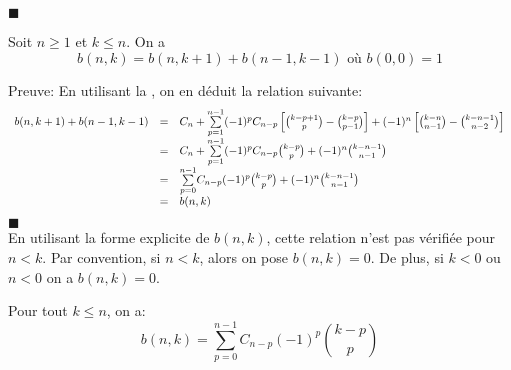 $\blacksquare$\vspace{5pt}
\begin{proposition} \label{bnkRec}
	Soit $ n\geq 1$ et $k\leq n$. On a
	\begin{equation} \label{eq:bnkRec}
		b(n,k)=b(n,k+1)+b(n-1,k-1) \text{ où } b(0,0)=1 %
	\end{equation}
\end{proposition}
Preuve:
En utilisant la , on en déduit la relation suivante:\\
\[
	\begin{array}{r c l}
		b(n,k+1)+ b(n-1,k-1) & = & C_{n}+\underset{p=1}{\overset{n-1}{\sum}}(-1)^pC_{n-p}\left[ \binom{k-p+1}{p}-\binom{k-p}{p-1} \right]+(-1)^n\left[ \binom{k-n}{n-1}-\binom{k-n-1}{n-2} \right] \\
		                     & = & C_{n}+\underset{p=1}{\overset{n-1}{\sum}}(-1)^pC_{n-p}\binom{k-p}{p}+(-1)^n\binom{k-n-1}{n-1}                                                                   \\
		                     & = & \underset{p=0}{\overset{n-1}{\sum}}C_{n-p}(-1)^p\binom{k-p}{p}+(-1)^n\binom{k-n-1}{n-1}                                                                         \\
		                     & = & b(n,k)
	\end{array}
\]
$\blacksquare$\vspace{10pt}\\
En utilisant la forme explicite de $b(n,k)$, cette relation n'est pas vérifiée pour $n<k$.
Par convention, si $n<k$, alors on pose $b(n,k)=0$.
De plus, si $k<0$ ou $n<0$ on a $b(n,k)=0$.
\begin{corollaire}
	Pour tout $k \leq n$, on a:
	$$ b(n,k)=\underset{p=0}{\overset{n-1}{\sum}}C_{n-p}(-1)^p\binom{k-p}{p} $$
\end{corollaire}

